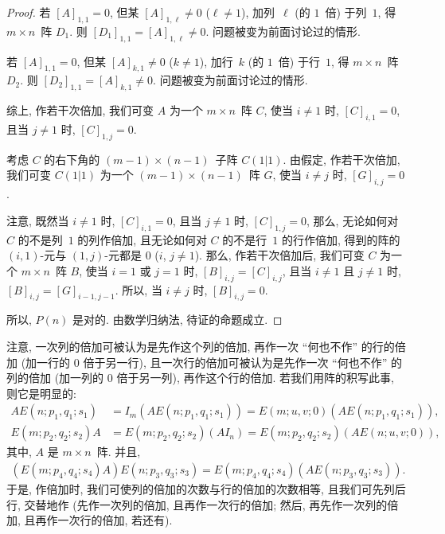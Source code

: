 \documentclass[../libro.tex]{subfiles}
\begin{document}
\begin{proof}
    若 \([A]_{1,1} = 0\), 但某 \([A]_{1,\ell} \neq 0\)
    (\(\ell \neq 1\)),
    加列~\(\ell\) (的 \(1\)~倍) 于列~\(1\),
    得 \(m \times n\)~阵 \(D_1\).
    则 \([D_1]_{1,1} = [A]_{1,\ell} \neq 0\).
    问题被变为前面讨论过的情形.

    若 \([A]_{1,1} = 0\), 但某 \([A]_{k,1} \neq 0\)
    (\(k \neq 1\)),
    加行~\(k\) (的 \(1\)~倍) 于行~\(1\),
    得 \(m \times n\)~阵 \(D_2\).
    则 \([D_2]_{1,1} = [A]_{k,1} \neq 0\).
    问题被变为前面讨论过的情形.

    综上, 作若干次倍加,
    我们可变 \(A\) 为一个 \(m \times n\)~阵 \(C\),
    使当 \(i \neq 1\) 时, \([C]_{i,1} = 0\),
    且当 \(j \neq 1\) 时, \([C]_{1,j} = 0\).

    考虑 \(C\) 的右下角的 \((m-1) \times (n-1)\)~子阵
    \(C(1|1)\).
    由假定, 作若干次倍加, 我们可变 \(C(1|1)\) 为一个
    \((m-1) \times (n-1)\)~阵 \(G\),
    使当 \(i \neq j\) 时, \([G]_{i,j} = 0\).

    注意, 既然当 \(i \neq 1\) 时, \([C]_{i,1} = 0\),
    且当 \(j \neq 1\) 时, \([C]_{1,j} = 0\),
    那么, 无论如何对 \(C\) 的不是列~\(1\) 的列作倍加,
    且无论如何对 \(C\) 的不是行~\(1\) 的行作倍加,
    得到的阵的 \((i, 1)\)-元与 \((1, j)\)-元都是 \(0\)
    (\(i\), \(j \neq 1\)).
    那么, 作若干次倍加后,
    我们可变 \(C\) 为一个 \(m \times n\)~阵 \(B\),
    使当 \(i = 1\) 或 \(j = 1\) 时,
    \([B]_{i,j} = [C]_{i,j}\),
    且当 \(i \neq 1\) 且 \(j \neq 1\) 时,
    \([B]_{i,j} = [G]_{i-1,j-1}\).
    所以, 当 \(i \neq j\) 时, \([B]_{i,j} = 0\).

    所以, \(P(n)\) 是对的.
    由数学归纳法, 待证的命题成立.
\end{proof}

注意,
一次列的倍加可被认为是先作这个列的倍加,
再作一次 ``何也不作'' 的行的倍加
(加一行的 \(0\) 倍于另一行),
且一次行的倍加可被认为是先作一次 ``何也不作'' 的列的倍加
(加一列的 \(0\) 倍于另一列),
再作这个行的倍加.
若我们用阵的积写此事, 则它是明显的:
\begin{align*}
    A E(n; p_1, q_1; s_1) & = I_m (A E(n; p_1, q_1; s_1))
    = E(m; u, v; 0) (A E(n; p_1, q_1; s_1)),              \\
    E(m; p_2, q_2; s_2) A & = E(m; p_2, q_2; s_2) (A I_n)
    = E(m; p_2, q_2; s_2) (A E(n; u, v; 0)),
\end{align*}
其中, \(A\) 是 \(m \times n\)~阵.
并且,
\begin{align*}
    (E(m; p_4, q_4; s_4) A) E(n; p_3, q_3; s_3)
    = E(m; p_4, q_4; s_4) (A E(n; p_3, q_3; s_3)).
\end{align*}
于是, 作倍加时,
我们可使列的倍加的次数与行的倍加的次数相等,
且我们可先列后行, 交替地作
(先作一次列的倍加, 且再作一次行的倍加;
然后, 再先作一次列的倍加, 且再作一次行的倍加, 若还有).
\end{document}
